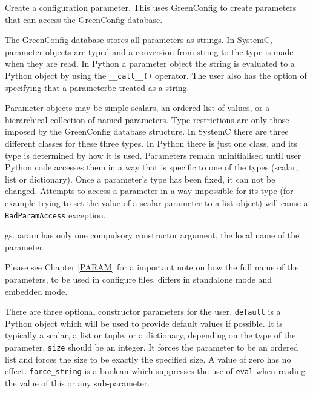 \documentclass[12pt,oneside]{gsbook}
\begin{document}
 { Create a configuration parameter. This uses
GreenConfig to create parameters that can access the GreenConfig database.

The GreenConfig database stores all parameters as strings.  In SystemC,
parameter objects are typed and a conversion from string to the type is
made when they are read.  In Python a parameter object the string is
evaluated to a Python object by using the \texttt{\_\_call\_\_()}
operator.  The user also has the
option of specifying that a parameterbe treated as a string.

Parameter objects may be simple scalars, an ordered list of values, or
a hierarchical collection of named parameters.  Type restrictions are
only those imposed by the GreenConfig database structure.  In SystemC
there are three different classes for these three types.  In Python there
is just one class, and its type is determined by how it is used.  Parameters
remain uninitialised until user Python code accesses them in a way that is
specific to one of the types (scalar, list or dictionary).  Once a
parameter's type has been fixed, it can not be changed.  Attempts to access
a parameter in a way impossible for its type (for example trying to set the
value of a scalar parameter to a list object) will cause a
\texttt{BadParamAccess} exception.

gs.param has only one compulsory constructor argument, the local name of the
parameter.

Please see Chapter \ref{PARAM} for a important note on how the full
name of the parameters, to be used in configure files, differs in
standalone mode and embedded mode.}

There are three optional constructor parameters for the user.  \texttt{default} is a Python
object which will be used to provide default values if possible.  It is
typically a scalar, a list or tuple, or a dictionary, depending on the type
of the parameter.  \texttt{size} should be an integer.  It forces the
parameter to be an ordered list and forces the size to be exactly the
specified size.  A value of zero has no effect.  \texttt{force\_string}
is a boolean which suppresses the use of \texttt{eval} when reading the
value of this or any sub-parameter.
\end{document}
